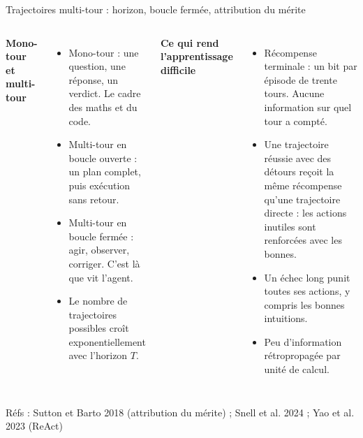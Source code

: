 \documentclass[aspectratio=169,10pt]{beamer}
\newcommand{\refs}[1]{\vfill{\tiny\textcolor{crMid}{Réfs : #1}}}
\begin{document}
\begin{frame}{Trajectoires multi-tour : horizon, boucle fermée, attribution du mérite}
\begin{columns}[T]
\textbf{Mono-tour et multi-tour}
\begin{itemize}
  \item Mono-tour : une question, une réponse, un verdict. Le cadre des maths et du code.
  \item Multi-tour en boucle ouverte : un plan complet, puis exécution sans retour.
  \item Multi-tour en boucle fermée : agir, observer, corriger. C'est là que vit l'agent.
  \item Le nombre de trajectoires possibles croît exponentiellement avec l'horizon $T$.
\end{itemize}
\textbf{Ce qui rend l'apprentissage difficile}
\begin{itemize}
  \item Récompense terminale : un bit par épisode de trente tours. Aucune information sur quel tour a compté.
  \item Une trajectoire réussie avec des détours reçoit la même récompense qu'une trajectoire directe : les actions inutiles sont renforcées avec les bonnes.
  \item Un échec long punit toutes ses actions, y compris les bonnes intuitions.
  \item Peu d'information rétropropagée par unité de calcul.
\end{itemize}
\end{columns}
\refs{Sutton et Barto 2018 (attribution du mérite) ; Snell et al. 2024 ; Yao et al. 2023 (ReAct)}
\end{frame}
\end{document}

